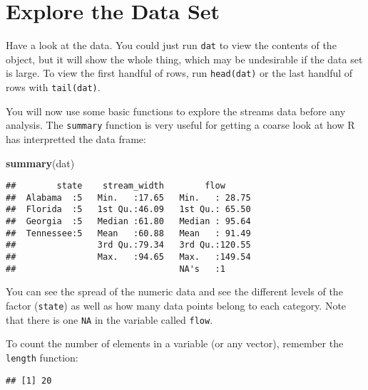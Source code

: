 \documentclass[]{book}
\newenvironment{Shaded}{\begin{snugshade}}{\end{snugshade}}
\newcommand{\KeywordTok}[1]{\textcolor[rgb]{0.13,0.29,0.53}{\textbf{#1}}}
\newcommand{\OperatorTok}[1]{\textcolor[rgb]{0.81,0.36,0.00}{\textbf{#1}}}
\newcommand{\NormalTok}[1]{#1}
\theoremstyle{definition}
\theoremstyle{definition}
\theoremstyle{definition}
\theoremstyle{remark}
\begin{document}
\section{Explore the Data Set}\label{explore-the-data-set}

Have a look at the data. You could just run \texttt{dat} to view the
contents of the object, but it will show the whole thing, which may be
undesirable if the data set is large. To view the first handful of rows,
run \texttt{head(dat)} or the last handful of rows with
\texttt{tail(dat)}.

You will now use some basic functions to explore the streams data before
any analysis. The \texttt{summary} function is very useful for getting a
coarse look at how R has interpretted the data frame:

\begin{Shaded}
\begin{Highlighting}[]
\KeywordTok{summary}\NormalTok{(dat)}
\end{Highlighting}
\end{Shaded}

\begin{verbatim}
##        state    stream_width        flow       
##  Alabama  :5   Min.   :17.65   Min.   : 28.75  
##  Florida  :5   1st Qu.:46.09   1st Qu.: 65.50  
##  Georgia  :5   Median :61.80   Median : 95.64  
##  Tennessee:5   Mean   :60.88   Mean   : 91.49  
##                3rd Qu.:79.34   3rd Qu.:120.55  
##                Max.   :94.65   Max.   :149.54  
##                                NA's   :1
\end{verbatim}

You can see the spread of the numeric data and see the different levels
of the factor (\texttt{state}) as well as how many data points belong to
each category. Note that there is one \texttt{NA} in the variable called
\texttt{flow}.

To count the number of elements in a variable (or any vector), remember
the \texttt{length} function:

\begin{Shaded}
\end{Shaded}

\begin{verbatim}
## [1] 20
\end{verbatim}
\end{document}
